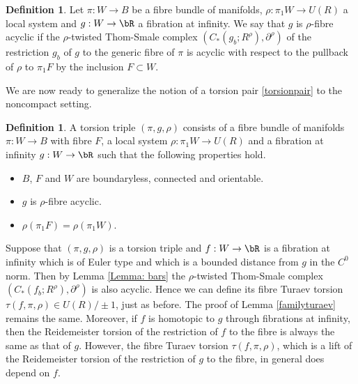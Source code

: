 \documentclass[JEP,XML,SOM,Unicode,NoFloatCountersInSection]{cedram}
\theoremstyle{plain}
\theoremstyle{definition}
\newtheorem{definition}[theorem]{Definition}
\begin{document}
\begin{definition}
Let $\pi: W \to B$ be a fibre bundle of manifolds, $\rho: \pi_1W \to U(R)$ a local system and $g:W \to \bR$ a fibration at infinity. We say that $g$ is $\rho$-fibre acyclic if the $\rho$-twisted Thom-Smale complex $(C_*(g_b; R^\rho), \partial^\rho)$ of the restriction $g_b$ of $g$ to the generic fibre of $\pi$ is acyclic with respect to the pullback of $\rho$ to $\pi_1F$ by the inclusion $F \subset W$.
\end{definition}

We are now ready to generalize the notion of a torsion pair \ref{torsionpair} to the noncompact setting.

\begin{definition}\label{torsiontriple}
A torsion triple $(\pi, g, \rho)$ consists of a fibre bundle of manifolds $\pi: W \to B$ with fibre $F$, a local system $\rho: \pi_1W \to U(R)$ and a fibration at infinity $g:W \to \bR$ such that the following properties hold.
\begin{itemize}
\item $B$, $F$ and $W$ are boundaryless, connected and orientable.
\item $g$ is $\rho$-fibre acyclic.
\item $\rho(\pi_1F)=\rho(\pi_1W)$.
\end{itemize}
\end{definition}
Suppose that $(\pi, g, \rho)$ is a torsion triple and $f:W \to \bR$ is a fibration at infinity which is of Euler type and which is a bounded distance from $g$ in the $C^0$ norm. Then by Lemma \ref{Lemma: bars} the $\rho$-twisted Thom-Smale complex $(C_*(f_b; R^\rho), \partial^\rho)$ is also acyclic. Hence we can define its fibre Turaev torsion $\tau( f,\pi,\rho) \in U(R) / \pm1 $, just as before. The proof of Lemma \ref{familyturaev} remains the same. Moreover, if $f$ is homotopic to $g$ through fibrations at infinity, then the Reidemeister torsion of the restriction of $f$ to the fibre is always the same as that of $g$. However, the fibre Turaev torsion $\tau(f,\pi, \rho)$, which is a lift of the Reidemeister torsion of the restriction of $g$ to the fibre, in general does depend on $f$.
\end{document}
